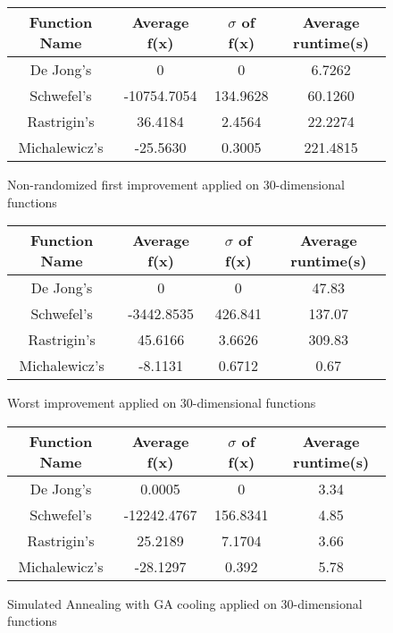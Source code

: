 \documentclass{article}
\begin{document}
\begin{figure}[H]
    \begin{tabular}{|c||c|c|c|} \hline
        Function Name & Average f(x) & $\sigma$ of f(x) & Average runtime(s) \\ \hline \hline
        De Jong's & 0 & 0 & 6.7262 \\ \hline
        Schwefel's & -10754.7054 & 134.9628 & 60.1260 \\ \hline
        Rastrigin's & 36.4184 & 2.4564 & 22.2274 \\ \hline
        Michalewicz's & -25.5630 & 0.3005 & 221.4815 \\ \hline
    \end{tabular}
    \caption{Non-randomized first improvement applied on 30-dimensional functions}
    \end{figure}

\begin{figure}[H]
\begin{tabular}{|c||c|c|c|} \hline
	Function Name & Average f(x) & $\sigma$ of f(x) & Average runtime(s) \\ \hline \hline
	De Jong's & 0 & 0 & 47.83 \\ \hline
	Schwefel's & -3442.8535 & 426.841 & 137.07 \\ \hline
	Rastrigin's & 45.6166 & 3.6626 & 309.83 \\ \hline
	Michalewicz's & -8.1131 & 0.6712 & 0.67 \\ \hline
\end{tabular}
\caption{Worst improvement applied on 30-dimensional functions}
\end{figure}

\begin{figure}[H]
\begin{tabular}{|c||c|c|c|} \hline
	Function Name & Average f(x) & $\sigma$ of f(x) & Average runtime(s) \\ \hline \hline
	De Jong's & 0.0005 & 0 & 3.34 \\ \hline
	Schwefel's & -12242.4767 & 156.8341 & 4.85 \\ \hline
	Rastrigin's & 25.2189 & 7.1704 & 3.66 \\ \hline
	Michalewicz's & -28.1297 & 0.392 & 5.78 \\ \hline
\end{tabular}
\caption{Simulated Annealing with GA cooling applied on 30-dimensional functions}
\end{figure}
\end{document}
